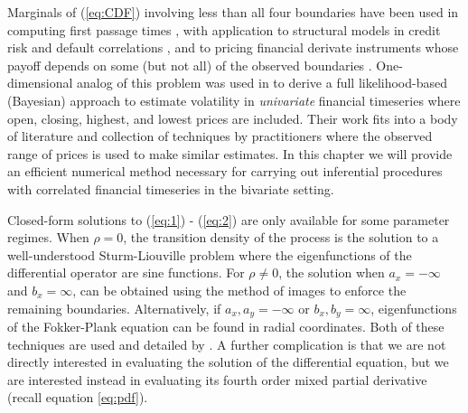 Marginals of (\ref{eq:CDF}) involving less than all four boundaries
have been used in computing first passage times \cite{kou2016first,
  sacerdote2016first}, with application to structural models in credit
risk and default correlations \cite{haworth2008modelling,
  ching2014correlated}, and to pricing financial derivate instruments
whose payoff depends on some (but not all) of the observed boundaries
\cite{he1998double}. One-dimensional analog of this problem was used
in \cite{rodriguez2012} to derive a full likelihood-based (Bayesian)
approach to estimate volatility in \textit{univariate} financial
timeseries where open, closing, highest, and lowest prices are
included. Their work fits into a body of literature and collection of
techniques by practitioners where the observed range of prices is used
to make similar estimates. In this chapter we will provide an
efficient numerical method necessary for carrying out inferential
procedures with correlated financial timeseries in the bivariate
setting.

Closed-form solutions to (\ref{eq:1}) - (\ref{eq:2}) are only
available for some parameter regimes. When $\rho = 0$, the transition
density of the process is the solution to a well-understood
Sturm-Liouville problem where the eigenfunctions of the differential
operator are sine functions. For $\rho \ne 0$, the solution when
$a_x = -\infty$ and $b_x = \infty$, can be obtained using the method
of images to enforce the remaining boundaries. Alternatively, if
$a_x, a_y = -\infty$ or $b_x, b_y = \infty$, eigenfunctions of the
Fokker-Plank equation can be found in radial coordinates. Both of
these techniques are used and detailed by \cite{he1998double}. A
further complication is that we are not directly interested in
evaluating the solution of the differential equation,
but we are interested instead in evaluating its fourth order mixed
partial derivative (recall equation \eqref{eq:pdf}).

